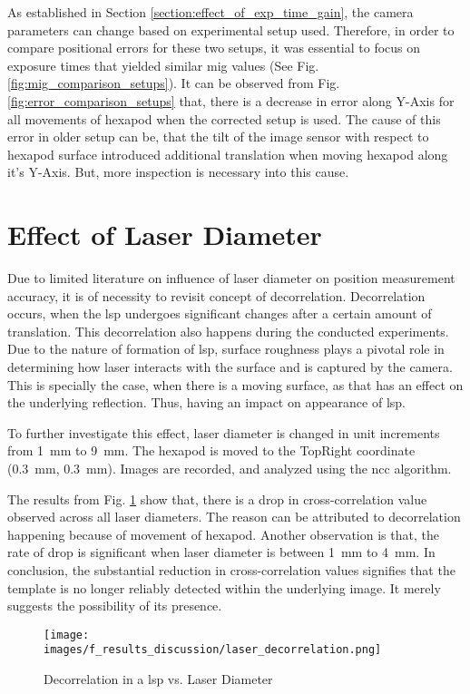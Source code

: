 \clearpage

\vspace{5mm}
\noindent As established in Section \ref{section:effect_of_exp_time_gain}, the camera parameters can change based on experimental setup used. Therefore, in order to compare positional errors for these two setups, it was essential to focus on exposure times that yielded similar \gls{mig} values (See Fig. \ref{fig:mig_comparison_setups}). It can be observed from Fig. \ref{fig:error_comparison_setups} that, there is a decrease in error along Y-Axis for all movements of hexapod when the corrected setup is used. The cause of this error in older setup can be, that the tilt of the image sensor with respect to hexapod surface introduced additional translation when moving hexapod along it's Y-Axis. But, more inspection is necessary into this cause.

\section{Effect of Laser Diameter}
Due to limited literature on influence of laser diameter on position measurement accuracy, it is of necessity to revisit concept of decorrelation. Decorrelation occurs, when the \gls{lsp} undergoes significant changes after a certain amount of translation. This decorrelation also happens during the conducted experiments. Due to the nature of formation of \gls{lsp}, surface roughness plays a pivotal role in determining how laser interacts with the surface and is captured by the camera. This is specially the case, when there is a moving surface, as that has an effect on the underlying reflection. Thus, having an impact on appearance of \gls{lsp}. 

\vspace{5mm}
\noindent To further investigate this effect, laser diameter is changed in unit increments from \SI{1}{\milli\meter} to \SI{9}{\milli\meter}. The hexapod is moved to the \textsf{TopRight} coordinate (\SI{0.3}{\milli\meter}, \SI{0.3}{\milli\meter}). Images are recorded, and analyzed using the \gls{ncc} algorithm. 

\vspace{5mm}
\noindent The results from Fig. \ref{fig:laser_decorrelation.png} show that, there is a drop in cross-correlation value observed across all laser diameters. The reason can be attributed to decorrelation happening because of movement of hexapod. Another observation is that, the rate of drop is significant when laser diameter is between \SI{1}{\milli\meter} to \SI{4}{\milli\meter}. In conclusion, the substantial reduction in cross-correlation values signifies that the template is no longer reliably detected within the underlying image. It merely suggests the possibility of its presence.

\begin{figure}[h]
    \centering
    \texttt{[image: images/f\_results\_discussion/laser\_decorrelation.png]}
    \caption{Decorrelation in a \gls{lsp} vs. Laser Diameter}
    \label{fig:laser_decorrelation.png}
\end{figure}

\clearpage